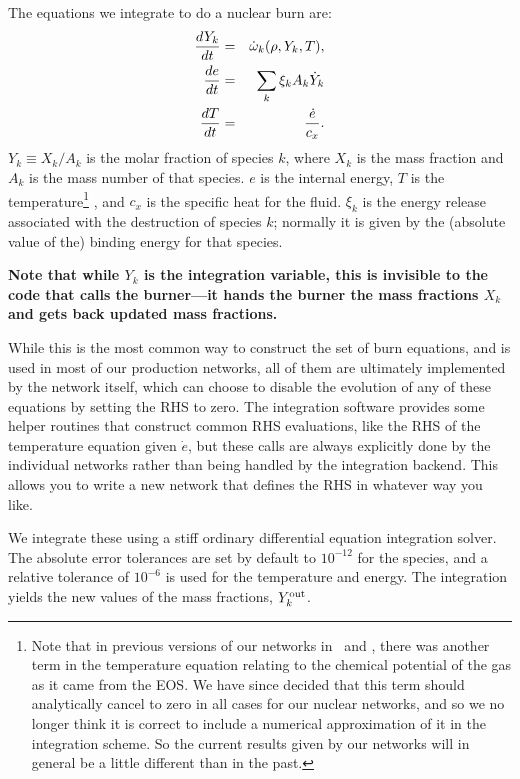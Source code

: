 The equations we integrate to do a nuclear burn are:
\begin{eqnarray}
  \frac{dY_k}{dt} &=& \dot\omega_k(\rho,Y_k,T), \label{eq:spec_integrate} \\
  \frac{de}{dt} &=& \sum_k \xi_k A_k \dot{Y}_k \label{eq:enuc_integrate} \\
  \frac{dT}{dt} &=&\frac{\dot{e}}{c_x}. \label{eq:temp_integrate}
\end{eqnarray}
$Y_k \equiv X_k / A_k$ is the molar fraction of species $k$, where
$X_k$ is the mass fraction and $A_k$ is the mass number of that species.
$e$ is the internal energy, $T$ is the temperature\footnote{Note that in
previous versions of our networks in \castro\ and \maestro,
there was another term in the temperature equation relating to the
chemical potential of the gas as it came from the EOS. We have since
decided that this term should analytically cancel to zero in all cases
for our nuclear networks, and so we no longer think it is correct to
include a numerical approximation of it in the integration scheme. So
the current results given by our networks will in general be a little
different than in the past.}
, and $c_x$ is the specific heat for the fluid. $\xi_k$ is the energy
release associated with the destruction of species $k$; normally it
is given by the (absolute value of the) binding energy for that species.

{\bf Note that while $Y_k$ is the integration variable, this is invisible to
the code that calls the burner---it hands the burner the mass fractions $X_k$
and gets back updated mass fractions.}


While this is the most common way to construct the set of
burn equations, and is used in most of our production networks,
all of them are ultimately implemented by the network itself, which
can choose to disable the evolution of any of these equations by
setting the RHS to zero. The integration software provides some
helper routines that construct common RHS evaluations, like the RHS
of the temperature equation given $\dot{e}$, but these calls
are always explicitly done by the individual networks rather than
being handled by the integration backend. This allows you to write a
new network that defines the RHS in whatever way you like.

We integrate these using a stiff ordinary differential equation
integration solver. The absolute error tolerances are set by default
to $10^{-12}$ for the species, and a relative tolerance of $10^{-6}$
is used for the temperature and energy.  The integration
yields the new values of the mass fractions, $Y_k^{\rm out}$.

